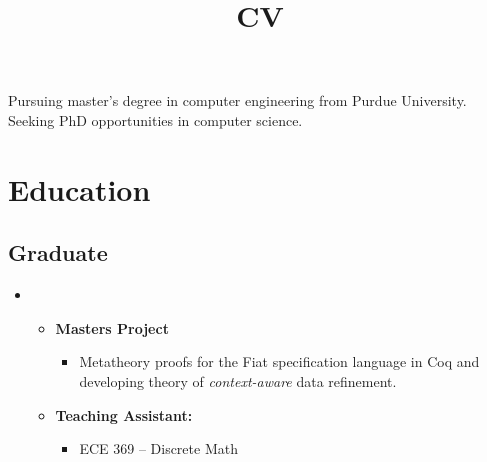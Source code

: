 \documentclass[10pt,a4paper,sans]{moderncv}        %
\title{CV}                               %
\begin{document}
\makecvtitle

\small{ Pursuing master's degree in computer engineering from Purdue
  University. Seeking PhD opportunities in computer science. }

\section{Education}

\vspace{3pt}

\subsection{Graduate}

\vspace{3pt}

\begin{itemize}

\item{}

  \begin{itemize}
  \item{
      \textbf{Masters Project}
      \begin{itemize}
      \item \parbox{0.75\linewidth}{Metatheory proofs for the Fiat
          specification language in Coq and developing theory of
          \emph{context-aware} data refinement. }
      \end{itemize}
    }
  \item{\textbf{Teaching Assistant:}}
    \begin{itemize}
    \item ECE 369 -- Discrete Math
    \end{itemize}
  \end{itemize}





\end{itemize}
\end{document}
